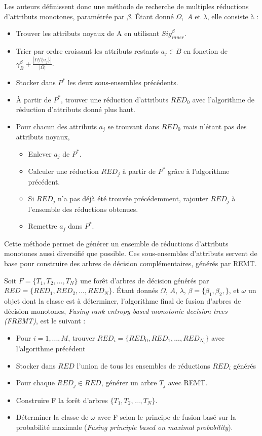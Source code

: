 \documentclass[a4paper]{article}
\begin{document}
\noindent Les auteurs définissent donc une méthode de recherche de multiples réductions
d'attributs monotones, paramétrée par $\beta$. Étant donné $\Omega$,~$A$ et
$\lambda$, elle consiste à :
\begin{itemize}
    \item Trouver les attributs noyaux de A en utilisant $Sig^{\beta}_{inner}$.
    \item Trier par ordre croissant les attributs restants $a_j \in B$ en fonction de
        $\gamma^{\beta}_{B} + \frac{|\Omega / \{a_j\}|}{|\Omega|}$.
    \item Stocker dans $P^*$ les deux sous-ensembles précédents.
    \item À partir de $P^*$, trouver une réduction
d'attributs $RED_0$ avec l'algorithme de réduction d'attributs donné plus haut.
    \item Pour chacun des attributs $a_j$ se trouvant dans $RED_0$ mais n'étant
        pas des attributs noyaux,
    \begin{itemize}
        \item Enlever $a_j$ de $P^*$.
        \item Calculer une réduction $RED_j$ à partir de $P^*$ grâce à
            l'algorithme précédent.
        \item Si $RED_j$ n'a pas déjà été trouvée précédemment, rajouter $RED_j$
            à l'ensemble des réductions obtenues.
        \item Remettre $a_j$ dans $P^*$.
    \end{itemize}
\end{itemize}

\noindent Cette méthode permet de générer un ensemble de réductions d'attributs monotones
aussi diversifié que possible. Ces sous-ensembles d'attributs servent de base pour construire des arbres de
décision complémentaires, générés par REMT. 

Soit $F = \{T_1,T_2,...,T_N\}$ une forêt d'arbres de décision générés par $RED =
\{RED_1,RED_2,...,RED_N\}$. Étant donnés $\Omega$, $A$, $\lambda$,
$\beta = \{\beta_1,\beta_2,\}$, et $\omega$ un objet dont la classe est à
déterminer, l'algorithme final de fusion d'arbres de décision
monotones, \emph{Fusing rank entropy based monotonic decision trees (FREMT)},
est le suivant :
\begin{itemize}
    \item Pour $i=1,...,M$, trouver $RED_i = \{RED_0,RED_1,...,RED_{N_i}\}$ avec
        l'algorithme précédent
    \item Stocker dans $RED$ l'union de tous les ensembles de réductions $RED_i$ générés
    \item Pour chaque $RED_j \in RED$, générer un arbre $T_j$ avec REMT.
    \item Construire F la forêt d'arbres $\{T_1,T_2,...,T_N\}$.
    \item Déterminer la classe de $\omega$ avec F selon le principe de fusion
        basé sur la probabilité maximale (\emph{Fusing principle based on
        maximal probability}). \\
\end{itemize}
\end{document}
